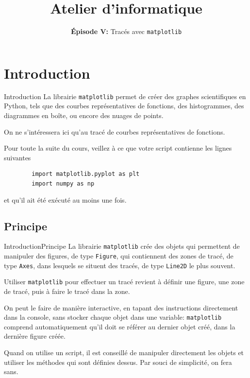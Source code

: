 

\title{Atelier d'informatique}
\subtitle{\textbf{Épisode V:} Tracés avec \lstinline|matplotlib|}



\begin{frame}
	\titlepage
\end{frame}

\frame{\tableofcontents}

\setlength\parskip{0.8em}
\section{Introduction}

\begin{frame}[fragile]{Introduction}
	La librairie \lstinline|matplotlib| permet de créer des graphes scientifiques en Python, tels que des courbes représentatives de fonctions, des histogrammes, des diagrammes en boîte, ou encore des nuages de points.\pause
	
	On ne s'intéressera ici qu'au tracé de courbes représentatives de fonctions.\pause
	
	Pour toute la suite du cours, veillez à ce que votre script contienne les lignes suivantes\pause
	\begin{lstlisting}
		import matplotlib.pyplot as plt
		import numpy as np
	\end{lstlisting} et qu'il ait été exécuté au moins une fois.
\end{frame}

\subsection{Principe}

\begin{frame}[fragile]{Introduction}{Principe}
	La librairie \lstinline|matplotlib| crée des objets qui permettent de manipuler des figures, de type \lstinline|Figure|, qui contiennent des zones de tracé, de type \lstinline|Axes|, dans lesquels se situent des tracés, de type \lstinline|Line2D| le plus souvent.\pause
	
	Utiliser \lstinline|matplotlib| pour effectuer un tracé revient à définir une figure, une zone de tracé, puis à faire le tracé dans la zone.
\end{frame}

\begin{frame}[fragile]	
	On peut le faire de manière interactive, en tapant des instructions directement dans la console, sans stocker chaque objet dans une variable: \lstinline|matplotlib| comprend automatiquement qu'il doit se référer au dernier objet créé, dans la dernière figure créée.\pause
	
	Quand on utilise un script, il est conseillé de manipuler directement les objets et utiliser les méthodes qui sont définies dessus. Par souci de simplicité, on fera sans.
\end{frame}


